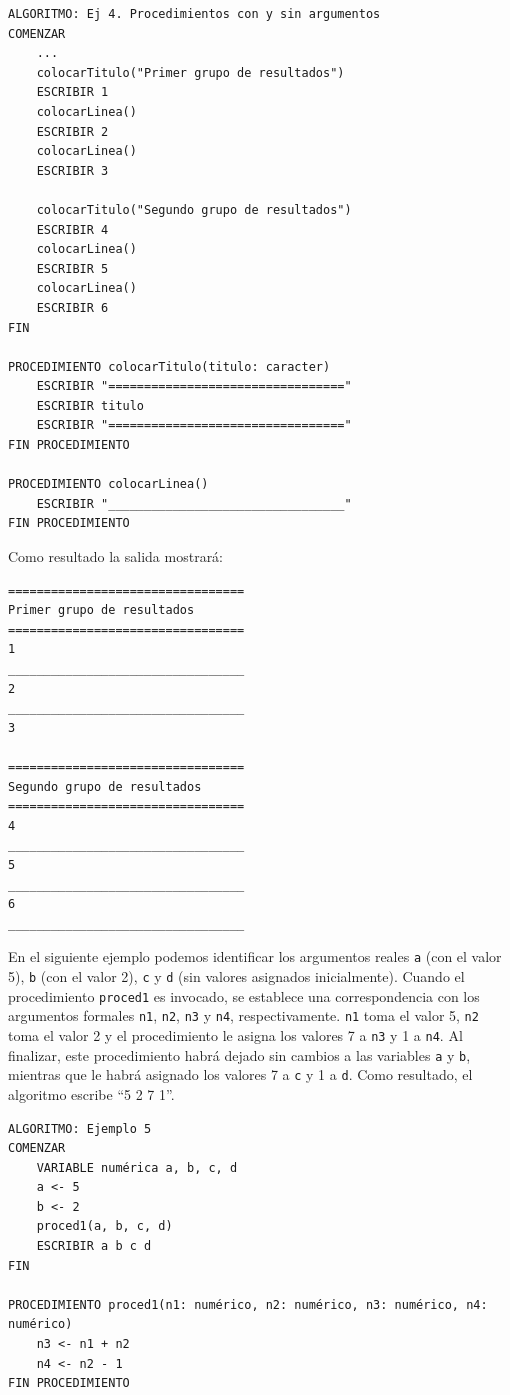 \documentclass[]{book}
\begin{document}
\begin{verbatim}
ALGORITMO: Ej 4. Procedimientos con y sin argumentos
COMENZAR
    ...
    colocarTitulo("Primer grupo de resultados")
    ESCRIBIR 1
    colocarLinea()
    ESCRIBIR 2
    colocarLinea()
    ESCRIBIR 3

    colocarTitulo("Segundo grupo de resultados")
    ESCRIBIR 4
    colocarLinea()
    ESCRIBIR 5
    colocarLinea()
    ESCRIBIR 6
FIN

PROCEDIMIENTO colocarTitulo(titulo: caracter)
    ESCRIBIR "================================="
    ESCRIBIR titulo
    ESCRIBIR "================================="
FIN PROCEDIMIENTO

PROCEDIMIENTO colocarLinea()
    ESCRIBIR "_________________________________"
FIN PROCEDIMIENTO
\end{verbatim}

Como resultado la salida mostrará:

\begin{verbatim}
=================================
Primer grupo de resultados
=================================
1
_________________________________
2
_________________________________
3

=================================
Segundo grupo de resultados
=================================
4
_________________________________
5
_________________________________
6
_________________________________
\end{verbatim}

En el siguiente ejemplo podemos identificar los argumentos reales
\texttt{a} (con el valor 5), \texttt{b} (con el valor 2), \texttt{c} y
\texttt{d} (sin valores asignados inicialmente). Cuando el procedimiento
\texttt{proced1} es invocado, se establece una correspondencia con los
argumentos formales \texttt{n1}, \texttt{n2}, \texttt{n3} y \texttt{n4},
respectivamente. \texttt{n1} toma el valor 5, \texttt{n2} toma el valor
2 y el procedimiento le asigna los valores 7 a \texttt{n3} y 1 a
\texttt{n4}. Al finalizar, este procedimiento habrá dejado sin cambios a
las variables \texttt{a} y \texttt{b}, mientras que le habrá asignado
los valores 7 a \texttt{c} y 1 a \texttt{d}. Como resultado, el
algoritmo escribe ``5 2 7 1''.

\begin{verbatim}
ALGORITMO: Ejemplo 5
COMENZAR
    VARIABLE numérica a, b, c, d
    a <- 5
    b <- 2
    proced1(a, b, c, d)
    ESCRIBIR a b c d
FIN

PROCEDIMIENTO proced1(n1: numérico, n2: numérico, n3: numérico, n4: numérico)
    n3 <- n1 + n2
    n4 <- n2 - 1
FIN PROCEDIMIENTO
\end{verbatim}
\end{document}

